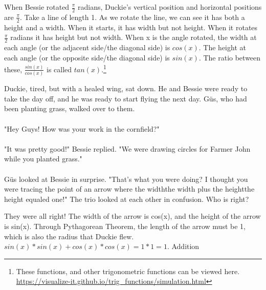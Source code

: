 {When Bessie rotated $\frac{\pi}{2}$ radians, Duckie's vertical position and horizontal positions are $\frac{\pi}{2}$.}
{Take a line of length 1. As we rotate the line, we can see it has both a height and a width. When it starts, it has width but not height. When it rotates $\frac{\pi}{2}$ radians it has height but not width. When x is the angle rotated, the width at each angle (or the adjacent side/the diagonal side) is $cos(x)$. The height at each angle (or the opposite side/the diagonal side) is $sin(x)$. The ratio between these, $\frac{sin(x)}{cos(x)}$ is called $tan(x)$.\footnote{These functions, and other trigonometric functions can be viewed here. \url{https://visualize-it.github.io/trig_functions/simulation.html}}}
{}
{Duckie, tired, but with a healed wing, sat down. He and Bessie were ready to take the day off, and he was ready to start flying the next day. Güs, who had been planting grass, walked over to them. 
\paragraph{} "Hey Guys! How was your work in the cornfield?"
\paragraph{} "It was pretty good!" Bessie replied. "We were drawing circles for Farmer John while you planted grass."
\paragraph{} Güs looked at Bessie in surprise. "That's what you were doing? I thought you were tracing the point of an arrow where the width\texttimes the width plus the height\texttimes the height equaled one!"
The trio looked at each other in confusion. Who is right?}
{They were all right! The width of the arrow is cos(x), and the height of the arrow is sin(x). Through Pythagorean Theorem, the length of the arrow must be 1, which is also the radius that Duckie flew.}
{$sin(x)\ast sin(x) + cos(x)\ast cos(x) = 1\ast 1 = 1$.}
{Addition}